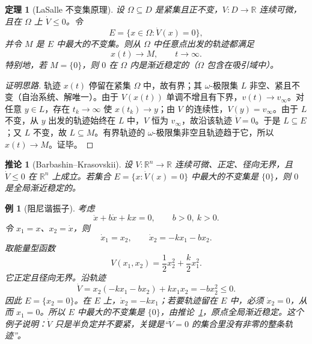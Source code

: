 \documentclass[11pt, a4paper, UTF8, fontset=none]{ctexart}
\theoremstyle{cnthm}
\newtheorem{theorem}{定理}[section]
\newtheorem{corollary}{推论}[section]
\newtheorem{example}{例}[section]
\newcommand{\R}{\mathbb{R}}
\begin{document}
\begin{theorem}[LaSalle 不变集原理]
\label{thm:lasalle}
设 $\Omega\subseteq D$ 是紧集且正不变，$V:D\to\R$ 连续可微，且在 $\Omega$ 上 $\dot V\le0$。令
\begin{equation}
  E=\{x\in\Omega:\dot V(x)=0\},
\end{equation}
并令 $M$ 是 $E$ 中最大的不变集。则从 $\Omega$ 中任意点出发的轨迹都满足
\begin{equation}
  x(t)\longrightarrow M,\qquad t\to\infty.
\end{equation}
特别地，若 $M=\{0\}$，则 $0$ 在 $\Omega$ 内是渐近稳定的（$\Omega$ 包含在吸引域中）。
\end{theorem}

\begin{proof}[证明思路]
轨迹 $x(t)$ 停留在紧集 $\Omega$ 中，故有界；其 $\omega$-极限集 $L$ 非空、紧且不变（自治系统、解唯一）。由于 $V(x(t))$ 单调不增且有下界，$v(t)\to v_\infty$。对任意 $y\in L$，存在 $t_k\to\infty$ 使 $x(t_k)\to y$；由 $V$ 的连续性，$V(y)=v_\infty$。由于 $L$ 不变，从 $y$ 出发的轨迹始终在 $L$ 中，$V$ 恒为 $v_\infty$，故沿该轨迹 $\dot V=0$。于是 $L\subseteq E$；又 $L$ 不变，故 $L\subseteq M$。有界轨迹的 $\omega$-极限集非空且轨迹趋于它，所以 $x(t)\to M$。证毕。
\end{proof}

\begin{corollary}[Barbashin--Krasovskii]
\label{cor:bk}
设 $V:\R^n\to\R$ 连续可微、正定、径向无界，且 $\dot V\le0$ 在 $\R^n$ 上成立。若集合 $E=\{x:\dot V(x)=0\}$ 中最大的不变集是 $\{0\}$，则 $0$ 是全局渐近稳定的。
\end{corollary}

\begin{example}[阻尼谐振子]
考虑
\begin{equation}
  \ddot x+b\dot x+kx=0,\qquad b>0,\ k>0.
\end{equation}
令 $x_1=x$、$x_2=\dot x$，则
\begin{equation}
  \dot x_1=x_2,\qquad \dot x_2=-kx_1-bx_2.
\end{equation}
取能量型函数
\begin{equation}
  V(x_1,x_2)=\frac12x_2^2+\frac{k}{2}x_1^2.
\end{equation}
它正定且径向无界。沿轨迹
\begin{equation}
  \dot V=x_2(-kx_1-bx_2)+kx_1x_2=-bx_2^2\le0.
\end{equation}
因此 $E=\{x_2=0\}$。在 $E$ 上，$\dot x_2=-kx_1$；若要轨迹留在 $E$ 中，必须 $\dot x_2=0$，从而 $x_1=0$。所以 $E$ 中最大的不变集是 $\{0\}$，由推论~\ref{cor:bk}，原点全局渐近稳定。这个例子说明：$\dot V$ 只是半负定并不要紧，关键是“$\dot V=0$ 的集合里没有非零的整条轨迹”。
\end{example}
\end{document}
